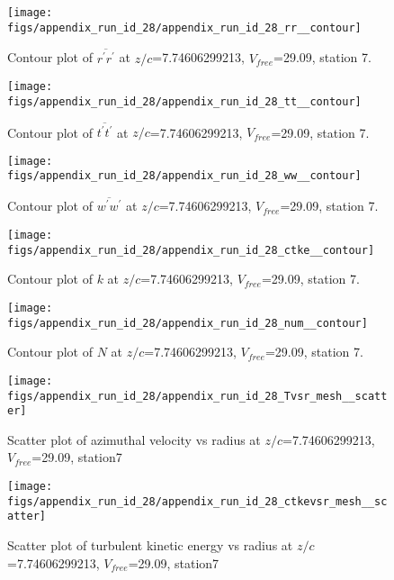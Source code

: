 \begin{figure}[H]
\centering
\texttt{[image: figs/appendix\_run\_id\_28/appendix\_run\_id\_28\_rr\_\_contour]}
\caption{Contour plot of $\overline{r^\prime r^\prime}$ at $z/c$=7.74606299213, $V_{free}$=29.09, station 7.}
\label{fig:appendix_run_id_28_rr__contour}
\end{figure}


\begin{figure}[H]
\centering
\texttt{[image: figs/appendix\_run\_id\_28/appendix\_run\_id\_28\_tt\_\_contour]}
\caption{Contour plot of $\overline{t^\prime t^\prime}$ at $z/c$=7.74606299213, $V_{free}$=29.09, station 7.}
\label{fig:appendix_run_id_28_tt__contour}
\end{figure}


\begin{figure}[H]
\centering
\texttt{[image: figs/appendix\_run\_id\_28/appendix\_run\_id\_28\_ww\_\_contour]}
\caption{Contour plot of $\overline{w^\prime w^\prime}$ at $z/c$=7.74606299213, $V_{free}$=29.09, station 7.}
\label{fig:appendix_run_id_28_ww__contour}
\end{figure}


\begin{figure}[H]
\centering
\texttt{[image: figs/appendix\_run\_id\_28/appendix\_run\_id\_28\_ctke\_\_contour]}
\caption{Contour plot of $k$ at $z/c$=7.74606299213, $V_{free}$=29.09, station 7.}
\label{fig:appendix_run_id_28_ctke__contour}
\end{figure}


\begin{figure}[H]
\centering
\texttt{[image: figs/appendix\_run\_id\_28/appendix\_run\_id\_28\_num\_\_contour]}
\caption{Contour plot of $N$ at $z/c$=7.74606299213, $V_{free}$=29.09, station 7.}
\label{fig:appendix_run_id_28_num__contour}
\end{figure}


\begin{figure}[H]
\centering
\texttt{[image: figs/appendix\_run\_id\_28/appendix\_run\_id\_28\_Tvsr\_mesh\_\_scatter]}
\caption{Scatter plot of azimuthal velocity vs radius at $z/c$=7.74606299213, $V_{free}$=29.09, station7}
\label{fig:appendix_run_id_28_Tvsr_mesh__scatter}
\end{figure}


\begin{figure}[H]
\centering
\texttt{[image: figs/appendix\_run\_id\_28/appendix\_run\_id\_28\_ctkevsr\_mesh\_\_scatter]}
\caption{Scatter plot of turbulent kinetic energy vs radius at $z/c$=7.74606299213, $V_{free}$=29.09, station7}
\label{fig:appendix_run_id_28_ctkevsr_mesh__scatter}
\end{figure}


